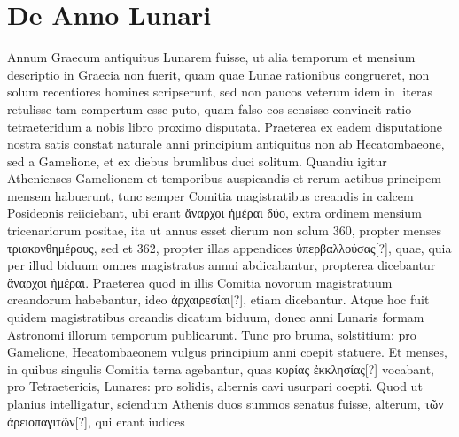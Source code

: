 

\chapter{De Anno Lunari}
%
Annum Graecum antiquitus Lunarem fuisse,
ut alia temporum et mensium descriptio
in Graecia non fuerit, quam quae Lunae
rationibus congrueret, non solum recentiores
homines scripserunt, sed non paucos
veterum idem in literas retulisse tam
compertum esse puto, quam falso eos sensisse
convincit ratio tetraeteridum a nobis
libro proximo disputata.
Praeterea ex
eadem disputatione nostra satis constat naturale anni principium antiquitus
non ab Hecatombaeone, sed a Gamelione, et ex diebus brumlibus
duci solitum.
Quandiu igitur Athenienses Gamelionem et temporibus
auspicandis et rerum actibus principem mensem habuerunt,
tunc semper Comitia magistratibus creandis in calcem Posideonis
reiiciebant, ubi erant \textgreek{ἄναρχοι ἡμέραι δύο},
 extra ordinem mensium tricenariorum
positae, ita ut annus esset dierum non solum 360, propter
menses \textgreek{τριακονθημέρους}, sed et 362,
 propter illas appendices \textgreek{ὑπερβαλλούσας[?]},
quae, quia per illud biduum omnes magistratus annui abdicabantur,
propterea dicebantur \textgreek{ἄναρχοι ἡμέραι}.
Praeterea quod in illis
Comitia novorum magistratuum creandorum habebantur, ideo
\textgreek{ἀρχαιρεσίαι[?]}, etiam dicebantur.
Atque hoc fuit quidem magistratibus
creandis dicatum biduum, donec anni Lunaris formam Astronomi illorum
temporum publicarunt.
Tunc pro bruma, solstitium: pro Gamelione,
Hecatombaeonem vulgus principium anni coepit statuere.
Et
menses, in quibus singulis Comitia terna agebantur, quas
 \textgreek{κυρίας ἐκκλησίας[?]}
vocabant, pro Tetraetericis, Lunares: pro solidis, alternis cavi
usurpari coepti.
Quod ut planius intelligatur, sciendum Athenis
duos summos senatus fuisse, alterum, \textgreek{τῶν ἀρειοπαγιτῶν[?]},
 qui erant iudices
